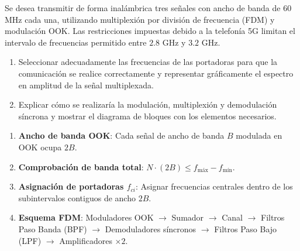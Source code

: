 \begin{problema}
Se desea transmitir de forma inalámbrica tres señales con ancho de banda de $60$ MHz cada una, utilizando multiplexión por división de frecuencia (FDM) y modulación OOK. Las restricciones impuestas debido a la telefonía 5G limitan el intervalo de frecuencias permitido entre $2.8$ GHz y $3.2$ GHz.
\begin{enumerate}[label=\alph*)]
    \item Seleccionar adecuadamente las frecuencias de las portadoras para que la comunicación se realice correctamente y representar gráficamente el espectro en amplitud de la señal multiplexada.
    \item Explicar cómo se realizaría la modulación, multiplexión y demodulación síncrona y mostrar el diagrama de bloques con los elementos necesarios.
\end{enumerate}
\end{problema}

\begin{mecanizado}
\begin{enumerate}
    \item \textbf{Ancho de banda OOK}: Cada señal de ancho de banda $B$ modulada en OOK ocupa $2B$.
    \item \textbf{Comprobación de banda total}: $N \cdot (2B) \le f_{\text{máx}} - f_{\text{mín}}$.
    \item \textbf{Asignación de portadoras $f_{ci}$}: Asignar frecuencias centrales dentro de los subintervalos contiguos de ancho $2B$.
    \item \textbf{Esquema FDM}: Moduladores OOK $\to$ Sumador $\to$ Canal $\to$ Filtros Paso Banda (BPF) $\to$ Demoduladores síncronos $\to$ Filtros Paso Bajo (LPF) $\to$ Amplificadores $\times 2$.
\end{enumerate}
\end{mecanizado}

